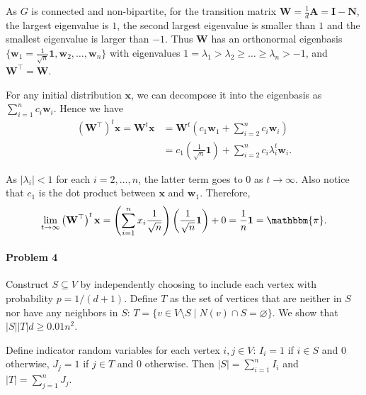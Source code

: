 \documentclass[12pt]{article}
\begin{document}
As $G$ is connected and non-bipartite, for the transition matrix $\mathbf{W}=\frac 1 d\mathbf{A}=\mathbf{I}-\mathbf{N}$, the largest eigenvalue is $1$, the second largest eigenvalue is smaller than $1$ and the smallest eigenvalue is larger than $-1$. Thus $\mathbf{W}$ has an orthonormal eigenbasis $\{\mathbf{w}_1=\frac{1}{\sqrt n}\mathbf{1},\mathbf{w}_2,\dots,\mathbf{w}_n\}$ with eigenvalues $1=\lambda_1>\lambda_2\ge\dots\ge\lambda_n>-1$, and $\mathbf{W}^\top=\mathbf{W}$.

For any initial distribution $\mathbf{x}$, we can decompose it into the eigenbasis as $\sum_{i=1}^nc_i\mathbf{w}_i$. Hence we have \begin{align*}
\left(\mathbf{W}^\top\right)^t\mathbf{x}=\mathbf{W}^t\mathbf{x}&=\mathbf{W}^t\left(c_1\mathbf{w}_1+\sum_{i=2}^nc_i\mathbf{w}_i\right)\\
&=c_1\left(\frac{1}{\sqrt n}\mathbf{1}\right)+\sum_{i=2}^nc_i\lambda_i^t\mathbf{w}_i.
\end{align*}

As $|\lambda_i|<1$ for each $i=2,\dots,n$, the latter term goes to $0$ as $t\to\infty$. Also notice that $c_1$ is the dot product between $\mathbf{x}$ and $\mathbf{w}_1$. Therefore, $$\lim_{t\to\infty}\left(\mathbf{W}^\top\right)^t\mathbf{x}=\left(\sum_{i=1}^n x_i\frac{1}{\sqrt n}\right)\left(\frac{1}{\sqrt n}\mathbf{1}\right)+0=\frac{1}{n}\mathbf{1}=\mathbbm{\pi}.$$
\paragraph{Problem 4}
Construct $S\subseteq V$ by independently choosing to include each vertex with probability $p=1/(d+1)$. Define $T$ as the set of vertices that are neither in $S$ nor have any neighbors in $S$: $T = \{v \in V \setminus S \mid N(v) \cap S = \varnothing\}$. We show that $|S||T|d\ge0.01n^2$.

Define indicator random variables for each vertex $i, j \in V$: $I_i = 1$ if $i \in S$ and $0$ otherwise, $J_j = 1$ if $j \in T$ and $0$ otherwise. Then $|S| = \sum_{i=1}^n I_i$ and $|T| = \sum_{j=1}^n J_j$.
\end{document}

